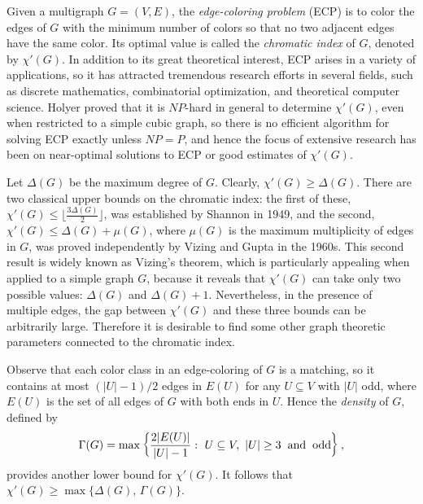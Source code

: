 \documentclass[11pt]{article}
\begin{document}
Given a multigraph $G=(V,E)$, the {\em edge-coloring problem} (ECP)\label{ECP} is to color the edges of $G$ with the minimum 
number of colors so that no two adjacent edges have the same color. Its optimal value is called the {\em chromatic 
index}\label{cindex} of $G$,  denoted by $\chi'(G)$. In addition to its great theoretical interest, ECP arises in a variety 
of applications, so it has attracted tremendous research efforts in several fields, such as discrete mathematics, combinatorial 
optimization, and theoretical computer science. Holyer \cite{H} proved that it is $NP$-hard in general 
to determine $\chi'(G)$, even when restricted to a simple cubic graph, so there is no efficient algorithm for 
solving ECP exactly unless $NP=P$, and hence the focus of extensive research has been on near-optimal solutions to 
ECP or good estimates of $\chi'(G)$.  

Let $\Delta(G)$ be the maximum degree of $G$. Clearly, $\chi'(G)\ge \Delta(G)$. There are two classical upper bounds
on the chromatic index: the first of these,  $\chi'(G) \le \lfloor \frac{3 \Delta(G)}{2} \rfloor$, was established 
by Shannon \cite{Sh} in 1949, and the second,  $\chi'(G) \le \Delta(G) +\mu(G)$, where $\mu(G)$ is the maximum multiplicity 
of edges in $G$, was proved independently by Vizing \cite{V} and Gupta \cite{G} in the 1960s. This second result is widely known as 
Vizing's theorem, which is particularly appealing when applied to a simple graph $G$, because it reveals that $\chi'(G)$
can take only two possible values: $\Delta(G)$ and $\Delta(G)+1$. Nevertheless, in the presence of multiple edges, 
the gap between $\chi'(G)$ and these three bounds can be arbitrarily large. Therefore it is desirable 
to find some other graph theoretic parameters connected to the chromatic index.

Observe that each color class in an edge-coloring of $G$ is a matching, so it contains at most $(|U|-1)/2$ edges 
in $E(U)$ for any $U \subseteq V$ with $|U|$ odd, where $E(U)$ is the set of all edges of $G$ with both ends in $U$.   
Hence the {\em density} of $G$\label{density}, defined by 
\[\Gamma(G)=\max \left\{\frac{2|E(U)|}{|U|-1}:\,\, U \subseteq V, \,\, |U|\ge 3 \hskip 2mm
{\rm and \hskip 2mm odd} \right\},\]
provides another lower bound for $\chi'(G)$. It follows that $\chi'(G) \ge \max\{\Delta(G), \, \Gamma(G)\}$.
\end{document}
